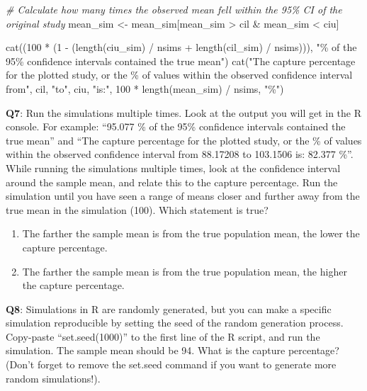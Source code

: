 \documentclass[
  oneside]{book}
\newenvironment{Shaded}{\begin{snugshade}}{\end{snugshade}}
\newcommand{\CommentTok}[1]{\textcolor[rgb]{0.56,0.35,0.01}{\textit{#1}}}
\newcommand{\DecValTok}[1]{\textcolor[rgb]{0.00,0.00,0.81}{#1}}
\newcommand{\FunctionTok}[1]{\textcolor[rgb]{0.00,0.00,0.00}{#1}}
\newcommand{\NormalTok}[1]{#1}
\newcommand{\OtherTok}[1]{\textcolor[rgb]{0.56,0.35,0.01}{#1}}
\newcommand{\SpecialCharTok}[1]{\textcolor[rgb]{0.00,0.00,0.00}{#1}}
\newcommand{\StringTok}[1]{\textcolor[rgb]{0.31,0.60,0.02}{#1}}
\providecommand{\tightlist}{%
  \setlength{\itemsep}{0pt}\setlength{\parskip}{0pt}}
\begin{document}
\begin{Shaded}
\begin{Highlighting}[]
\CommentTok{\# Calculate how many times the observed mean fell within the 95\% CI of the original study}
\NormalTok{mean\_sim }\OtherTok{\textless{}{-}}\NormalTok{ mean\_sim[mean\_sim }\SpecialCharTok{\textgreater{}}\NormalTok{ cil }\SpecialCharTok{\&}\NormalTok{ mean\_sim }\SpecialCharTok{\textless{}}\NormalTok{ ciu]}

\FunctionTok{cat}\NormalTok{((}\DecValTok{100} \SpecialCharTok{*}\NormalTok{ (}\DecValTok{1} \SpecialCharTok{{-}}\NormalTok{ (}\FunctionTok{length}\NormalTok{(ciu\_sim) }\SpecialCharTok{/}\NormalTok{ nsims }\SpecialCharTok{+} \FunctionTok{length}\NormalTok{(cil\_sim) }\SpecialCharTok{/}\NormalTok{ nsims))),}
    \StringTok{"\% of the 95\% confidence intervals contained the true mean"}\NormalTok{)}
\FunctionTok{cat}\NormalTok{(}\StringTok{"The capture percentage for the plotted study, or the \% of values within}
\StringTok{    the observed confidence interval from"}\NormalTok{, cil, }\StringTok{"to"}\NormalTok{, ciu,}
    \StringTok{"is:"}\NormalTok{, }\DecValTok{100} \SpecialCharTok{*} \FunctionTok{length}\NormalTok{(mean\_sim) }\SpecialCharTok{/}\NormalTok{ nsims, }\StringTok{"\%"}\NormalTok{)}
\end{Highlighting}
\end{Shaded}

\textbf{Q7}: Run the simulations multiple times. Look at the output you will get in the R console. For example: ``95.077 \% of the 95\% confidence intervals contained the true mean'' and ``The capture percentage for the plotted study, or the \% of values within the observed confidence interval from 88.17208 to 103.1506 is: 82.377 \%''. While running the simulations multiple times, look at the confidence interval around the sample mean, and relate this to the capture percentage. Run the simulation until you have seen a range of means closer and further away from the true mean in the simulation (100). Which statement is true?

\begin{enumerate}
\def\labelenumi{\Alph{enumi})}
\tightlist
\item
  The farther the sample mean is from the true population mean, the lower the capture percentage.
\item
  The farther the sample mean is from the true population mean, the higher the capture percentage.
\end{enumerate}

\textbf{Q8}: Simulations in R are randomly generated, but you can make a specific simulation reproducible by setting the seed of the random generation process. Copy-paste ``set.seed(1000)'' to the first line of the R script, and run the simulation. The sample mean should be 94. What is the capture percentage? (Don't forget to remove the set.seed command if you want to generate more random simulations!).
\end{document}
